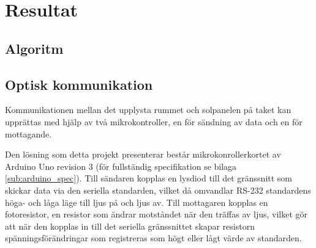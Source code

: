 \section{Resultat} %
\label{sec:resultat}
    \subsection{Algoritm} %
    \label{sub:algoritm}

    \subsection{Optisk kommunikation} %
    \label{sub:optisk_kommunikation}

        Kommunikationen mellan det upplysta rummet och solpanelen på taket kan upprättas med hjälp av två mikrokontroller, en för sändning av data och en för mottagande. \bigskip

        Den lösning som detta projekt presenterar består mikrokonrollerkortet av Arduino Uno revision 3 (för fullständig specifikation se bilaga \ref{sub:arduino_spec}).\cite{ardu} Till sändaren kopplas en lysdiod till det gränssnitt som skickar data via den seriella standarden, vilket då omvandlar RS-232 standardens höga- och låga läge till ljus på och ljus av. Till mottagaren kopplas en fotoresistor, en resistor som ändrar motståndet när den träffas av ljus, vilket gör att när den kopplas in till det seriella gränssnittet skapar resistorn spänningsförändringar som registreras som högt eller lågt värde av standarden.


    
